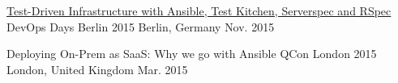 \begin{cventries}
    \vspace{-4mm}




  \cventry
    {\href{https://www.slideshare.net/MartinEtmajer/testing-ansible-roles-with-test-kitchen-serverspec-and-rspec-48185017}{Test-Driven Infrastructure with Ansible, Test Kitchen, Serverspec and RSpec}}
    {DevOps Days Berlin 2015}
    {Berlin, Germany}
    {Nov. 2015}
    {}

    \vspace{-4mm}


  \cventry
    {Deploying On-Prem as SaaS: Why we go with Ansible}
    {QCon London 2015}
    {London, United Kingdom}
    {Mar. 2015}
    {}

    \vspace{-4mm}

\end{cventries}
